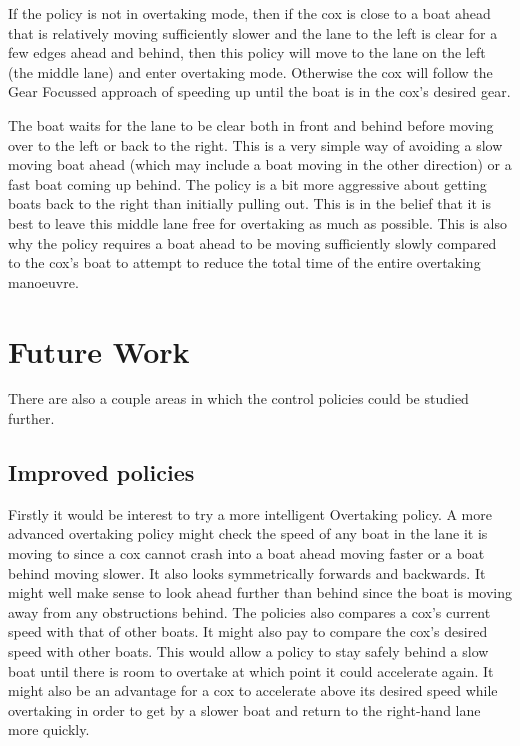 If the policy is not in overtaking mode, then if the cox is close to a boat ahead that is relatively moving sufficiently slower and the lane to the left is clear for a few edges ahead and behind, then this policy will move to the lane on the left (the middle lane) and enter overtaking mode. Otherwise the cox will follow the Gear Focussed approach of speeding up until the boat is in the cox's desired gear.

The boat waits for the lane to be clear both in front and behind before moving over to the left or back to the right. This is a very simple way of avoiding a slow moving boat ahead (which may include a boat moving in the other direction) or a fast boat coming up behind. The policy is a bit more aggressive about getting boats back to the right than initially pulling out. This is in the belief that it is best to leave this middle lane free for overtaking as much as possible. This is also why the policy requires a boat ahead to be moving sufficiently slowly compared to the cox's boat to attempt to reduce the total time of the entire overtaking manoeuvre.




\section{Future Work}
There are also a couple areas in which the control policies could be studied further.

\subsection{Improved policies}
Firstly it would be interest to try a more intelligent Overtaking policy. A more advanced overtaking policy might check the speed of any boat in the lane it is moving to since a cox cannot crash into a boat ahead moving faster or a boat behind moving slower. It also looks symmetrically forwards and backwards. It might well make sense to look ahead further than behind since the boat is moving away from any obstructions behind. The policies also compares a cox's current speed with that of other boats. It might also pay to compare the cox's desired speed with other boats. This would allow a policy to stay safely behind a slow boat until there is room to overtake at which point it could accelerate again. It might also be an advantage for a cox to accelerate above its desired speed while overtaking in order to get by a slower boat and return to the right-hand lane more quickly.

